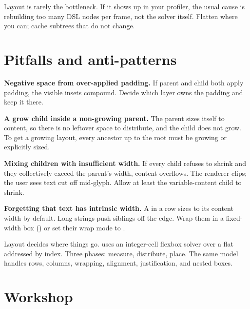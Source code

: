 Layout is rarely the bottleneck. If it shows up in your profiler,
the usual cause is rebuilding too many DSL nodes per frame, not
the solver itself. Flatten where you can; cache 
subtrees that do not change.

\section{Pitfalls and anti-patterns}
\label{sec:layout:pitfalls}

\begin{warning}
\textbf{Negative space from over-applied padding.} If parent and
child both apply padding, the visible insets compound. Decide which
layer owns the padding and keep it there.
\end{warning}

\begin{warning}
\textbf{A grow child inside a non-growing parent.} The parent sizes
itself to content, so there is no leftover space to distribute, and
the child does not grow. To get a growing layout, every ancestor up
to the root must be growing or explicitly sized.
\end{warning}

\begin{warning}
\textbf{Mixing  children with insufficient width.}
If every child refuses to shrink and they collectively exceed the
parent's width, content overflows. The renderer clips; the user
sees text cut off mid-glyph. Allow at least the variable-content
child to shrink.
\end{warning}

\begin{warning}
\textbf{Forgetting that text has intrinsic width.} A
 in a row sizes to its content width by default.
Long strings push siblings off the edge. Wrap them in a fixed-width
box () or set their wrap mode to
.
\end{warning}

\begin{recap}
Layout decides where things go. \maya{} uses an integer-cell flexbox
solver over a flat  addressed by index.
Three phases: measure, distribute, place. The same model handles
rows, columns, wrapping, alignment, justification, and nested boxes.
\end{recap}

\section*{Workshop}

